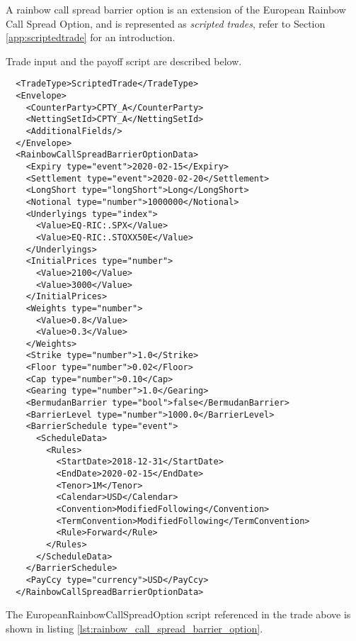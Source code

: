 A rainbow call spread barrier option is an extension of the European Rainbow Call Spread Option, and is
represented as {\em scripted trades}, refer to Section \ref{app:scriptedtrade} for an introduction.

Trade input and the payoff script are described below.

\begin{verbatim}
  <TradeType>ScriptedTrade</TradeType>
  <Envelope>
    <CounterParty>CPTY_A</CounterParty>
    <NettingSetId>CPTY_A</NettingSetId>
    <AdditionalFields/>
  </Envelope>
  <RainbowCallSpreadBarrierOptionData>
    <Expiry type="event">2020-02-15</Expiry>
    <Settlement type="event">2020-02-20</Settlement>
    <LongShort type="longShort">Long</LongShort>
    <Notional type="number">1000000</Notional>
    <Underlyings type="index">
      <Value>EQ-RIC:.SPX</Value>
      <Value>EQ-RIC:.STOXX50E</Value>
    </Underlyings>
    <InitialPrices type="number">
      <Value>2100</Value>
      <Value>3000</Value>
    </InitialPrices>
    <Weights type="number">
      <Value>0.8</Value>
      <Value>0.3</Value>
    </Weights>
    <Strike type="number">1.0</Strike>
    <Floor type="number">0.02</Floor>
    <Cap type="number">0.10</Cap>
    <Gearing type="number">1.0</Gearing>
    <BermudanBarrier type="bool">false</BermudanBarrier>
    <BarrierLevel type="number">1000.0</BarrierLevel>
    <BarrierSchedule type="event">
      <ScheduleData>
        <Rules>
          <StartDate>2018-12-31</StartDate>
          <EndDate>2020-02-15</EndDate>
          <Tenor>1M</Tenor>
          <Calendar>USD</Calendar>
          <Convention>ModifiedFollowing</Convention>
          <TermConvention>ModifiedFollowing</TermConvention>
          <Rule>Forward</Rule>
        </Rules>
      </ScheduleData>
    </BarrierSchedule>
    <PayCcy type="currency">USD</PayCcy>
  </RainbowCallSpreadBarrierOptionData>
\end{verbatim}

The EuropeanRainbowCallSpreadOption script referenced in the trade above is shown in listing
\ref{lst:rainbow_call_spread_barrier_option}.

